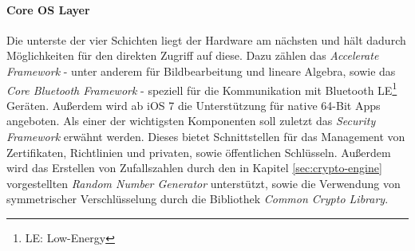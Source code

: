 		\paragraph{Core OS Layer}
			Die unterste der vier Schichten liegt der Hardware am nächsten und
			hält dadurch Möglichkeiten für den direkten Zugriff auf diese. Dazu zählen
			das \textsl{Accelerate Framework} - unter anderem für Bildbearbeitung und
			lineare Algebra, sowie das \textsl{Core Bluetooth Framework} - speziell für
			die Kommunikation mit Bluetooth LE\footnote{LE: Low-Energy} Geräten.
			Außerdem wird ab iOS 7 die Unterstützung für native 64-Bit Apps angeboten.
			Als einer der wichtigsten Komponenten soll zuletzt das \textsl{Security
			Framework} erwähnt werden.
			Dieses bietet Schnittstellen für das Management von Zertifikaten, Richtlinien
			und privaten, sowie öffentlichen Schlüsseln. Außerdem wird das Erstellen von
			Zufallszahlen durch den in Kapitel \ref{sec:crypto-engine}
			vorgestellten \textsl{Random Number Generator} unterstützt, sowie die
			Verwendung von symmetrischer Verschlüsselung durch die Bibliothek
			\textsl{Common Crypto Library}.
